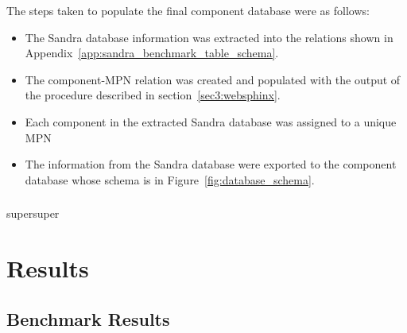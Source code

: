         The steps taken to populate the final component database were as follows:
        \begin{itemize}
            \item The Sandra database information was extracted into the relations shown in Appendix~\ref{app:sandra_benchmark_table_schema}.
            \item The component-MPN relation was created and populated with the output of the procedure described in section~\ref{sec3:websphinx}.
            \item Each component in the extracted Sandra database was assigned to a unique MPN
            \item The information from the Sandra database were exported to the component database whose schema is in Figure~\ref{fig:database_schema}.
        \end{itemize}
    
    \subsubsection*{}
        supersuper
    
\section{Results} \label{sec4:results}
\subsection{Benchmark Results} \label{sec4:benchmark_results}


